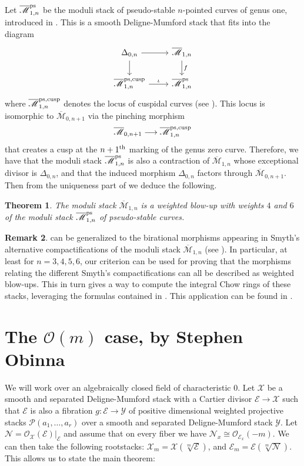 \documentclass{amsart}
\newcommand{\cE}{\mathcal{E}}
\newcommand{\cN}{\mathcal{N}}
\newcommand{\cO}{\mathcal{O}}
\newcommand{\cP}{\mathcal{P}}
\newcommand{\cX}{\mathcal{X}}
\newcommand{\cY}{\mathcal{Y}}
\newtheorem{theorem}{Theorem}[section]
\theoremstyle{definition}
\newtheorem{Remark}[theorem]{Remark}
\begin{document}
Let $\overline{\mathscr{M}}_{1,n}^{\rm{ps}}$ be the moduli stack of pseudo-stable $n$-pointed curves of genus one, introduced in \cite[Sec. 5]{Sch}. This is a smooth Deligne-Mumford stack that fits into the diagram
\[
\begin{tikzcd}
    \Delta_{0,n} \ar[r] \ar[d] & \overline{\mathscr{M}}_{1,n} \ar[d, "f"] \\
    \overline{\mathscr{M}}^{\rm{ps, cusp}}_{1,n} \ar[r, "\iota"] & \overline{\mathscr{M}}_{1,n}^{\rm{ps}}
\end{tikzcd}
\]
where $\overline{\mathscr{M}}^{\rm{ps, cusp}}_{1,n}$ denotes the locus of cuspidal curves (see \cite[Prop. 3.11]{CTV}). This locus is isomorphic to $\overline{\mathscr{M}}_{0,n+1}$ via the pinching morphism \cite[Sec. 2]{DLPV}
\[ \overline{\mathscr{M}}_{0,n+1} \longrightarrow \overline{\mathscr{M}}^{\rm{ps, cusp}}_{1,n} \]
that creates a cusp at the $n+1^{\rm{th}}$ marking of the genus zero curve. Therefore, we have that the moduli stack $\overline{\mathscr{M}}_{1,n}^{\rm{ps}}$ is also a contraction of $\overline{\mathscr{M}}_{1,n}$ whose exceptional divisor is $\Delta_{0,n}$, and that the induced morphism $\Delta_{0,n}$ factors through $\overline{\mathscr{M}}_{0,n+1}$. Then from the uniqueness part of  we deduce the following.
\begin{theorem}\label{thm:elliptic}
    The moduli stack $\overline{\mathscr{M}}_{1,n}$ is a weighted blow-up with weights $4$ and $6$ of the moduli stack $\overline{\mathscr{M}}_{1,n}^{\rm{ps}}$ of pseudo-stable curves.
\end{theorem}
\begin{Remark}
     can be generalized to the birational morphisms appearing in Smyth's alternative compactifications of the moduli stack $\overline{\mathscr{M}}_{1,n}$ (see \cite{Smy11}). In particular, at least for $n=3,4,5, 6$, our criterion can be used for proving that the morphisms relating the different Smyth's compactifications can all be described as weighted blow-ups. This in turn gives a way to compute the integral Chow rings of these stacks, leveraging the formulas contained in \cite{AO}. This application can be found in \cite{BDL}.
\end{Remark}
\appendix
\section{The $\cO(m)$ case, by Stephen Obinna}\label{section_appendix}
We will work over an algebraically closed field of characteristic 0. Let $\cX$ be a smooth and separated Deligne-Mumford stack with a Cartier divisor $\cE\to \cX$ such that $\cE$ is also a fibration $g:\cE\to \cY$ of positive dimensional weighted projective stacks $\cP(a_1,\dots,a_r)$  over a smooth and separated Deligne-Mumford stack $\cY$.
Let $\cN=\mathcal{O}_{\cX}(\cE)|_{\cE}$ 
and assume that on every fiber we have $\cN_x\cong \mathcal{O}_{\cE_x}(-m)$.
We can then take the following rootstacks:
$\cX_m=\cX(\sqrt[m]{\cE})$, and
$\cE_m=\cE(\sqrt[m]{\cN})$.
This allows us to state the main theorem:
\end{document}
